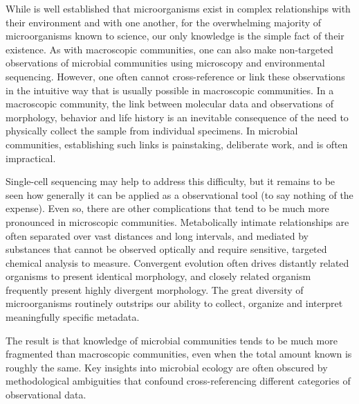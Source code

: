 
While is well established that microorganisms exist in complex relationships with their environment and with one another, for the overwhelming majority of microorganisms known to science, our only knowledge is the simple fact of their existence. As with macroscopic communities, one can also make non-targeted observations of microbial communities using microscopy and environmental sequencing. However, one often cannot cross-reference or link these observations in the intuitive way that is usually possible in macroscopic communities. In a macroscopic community, the link between molecular data and observations of morphology, behavior and life history is an inevitable consequence of the need to physically collect the sample from individual specimens. In microbial communities, establishing such links is painstaking, deliberate work, and is often impractical. 

Single-cell sequencing may help to address this difficulty, but it remains to be seen how generally it can be applied as a observational tool (to say nothing of the expense). Even so, there are other complications that tend to be much more pronounced in microscopic communities. Metabolically intimate relationships are often separated over vast distances and long intervals, and mediated by substances that cannot be observed optically and require sensitive, targeted chemical analysis to measure. Convergent evolution often drives distantly related organisms to present identical morphology, and closely related organism frequently present highly divergent morphology. The great diversity of microorganisms routinely outstrips our ability to collect, organize and interpret meaningfully specific metadata.

The result is that knowledge of microbial communities tends to be much more fragmented than macroscopic communities, even when the total amount known is roughly the same. Key insights into microbial ecology are often obscured by methodological ambiguities that confound cross-referencing different categories of observational data. 

